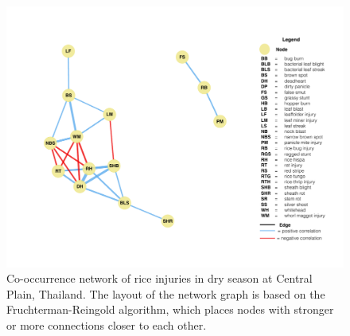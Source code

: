 \begin{figure}
    \centering
        \includegraphics[width = 1\textwidth]{figures/fullnetwork_WJws.pdf}
        \caption{Co-occurrence network of rice injuries in dry season at Central Plain, Thailand. The layout of the network graph is based on the Fruchterman-Reingold algorithm, which places nodes with stronger or more connections closer to each other.}
        \label{fig:fullnetwork_WJws}
    \end{figure}

